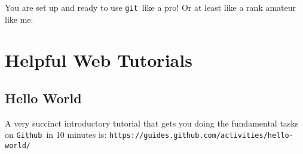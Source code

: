 \documentclass[14pt]{amsart}
\newcommand{\git}{{\texttt{git}}}
\newcommand{\github}{{\texttt{Github}}}
\begin{document}
You are set up and ready to use \git\ like a pro!  Or at least like a rank amateur like me.

\section{Helpful Web Tutorials}

\subsection{Hello World}

A very succinct introductory tutorial that gets you doing the fundamental tasks on \github\ in 10 minutes is: \texttt{https://guides.github.com/activities/hello-world/}
\end{document}
